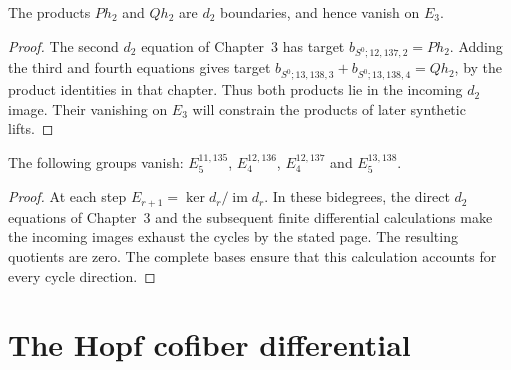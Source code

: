 \begin{theorem}
\label{sem:Computation:product-boundaries}
The products $Ph_2$ and $Qh_2$ are $d_2$ boundaries, and hence vanish
on $E_3$.
\end{theorem}
\begin{proof}
The second $d_2$ equation of Chapter~3 has target
$b_{S^0;12,137,2}=Ph_2$. Adding the third and fourth equations gives
target $b_{S^0;13,138,3}+b_{S^0;13,138,4}=Qh_2$, by the product
identities in that chapter. Thus both products lie in the incoming
$d_2$ image. Their vanishing on $E_3$ will constrain the products of
later synthetic lifts.
\end{proof}


\begin{theorem}
\label{sem:Computation:higher-page-vanishing}
The following groups vanish: $E_5^{11,135}$, $E_4^{12,136}$, $E_4^{12,137}$ and
$E_5^{13,138}$.
\end{theorem}
\begin{proof}
At each step $E_{r+1}=\ker d_r/\operatorname{im}d_r$. In these
bidegrees, the direct $d_2$ equations of Chapter~3 and the subsequent
finite differential calculations make the incoming images exhaust
the cycles by the stated page. The resulting quotients are zero.
The complete bases ensure that this calculation accounts for every
cycle direction.
\end{proof}


\section{The Hopf cofiber differential}

